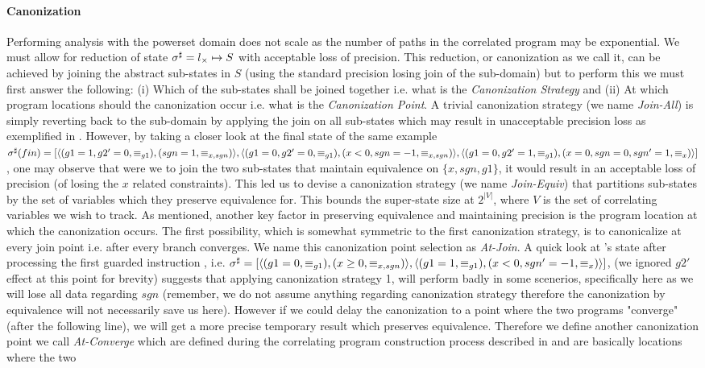 \paragraph{Canonization}
Performing analysis with the powerset domain does not scale as the number of paths in the correlated program may be exponential. We must allow for reduction of state $\sigma^\sharp = l_{\times} \mapsto S$ with acceptable loss of precision. This reduction, or canonization as we call it, can be achieved by joining the abstract sub-states in $S$ (using the standard precision losing join of the sub-domain) but to perform this we must first answer the following: (i) Which of the sub-states shall be joined together i.e. what is the \emph{Canonization Strategy} and (ii) At which program locations should the canonization occur i.e. what is the \emph{Canonization Point}. A trivial canonization strategy (we name \emph{Join-All}) is simply reverting back to the sub-domain by applying the join on all sub-states which may result in unacceptable precision loss as exemplified in . However, by taking a closer look at the final state of the same example $\sigma^\sharp(fin) = [\langle (g1=1,g2'=0,\equiv_{g1}),(sgn=1,\equiv_{x,sgn}) \rangle, \langle (g1=0,g2'=0,\equiv_{g1}), (x<0,sgn=-1,\equiv_{x,sgn}) \rangle , \langle (g1=0,g2'=1,\equiv_{g1}),(x=0,sgn=0,sgn'=1,\equiv_{x}) \rangle]$, one may observe that were we to join the two sub-states that maintain equivalence on $\{x,sgn,g1\}$, it would result in an acceptable loss of precision (of losing the $x$ related constraints). This led us to devise a canonization strategy (we name \emph{Join-Equiv}) that partitions sub-states by the set of variables which they preserve equivalence for. This bounds the super-state size at $2^{|V|}$, where $V$ is the set of correlating variables we wish to track. As mentioned, another key factor in preserving equivalence and maintaining precision is the program location at which the canonization occurs. The first possibility, which is somewhat symmetric to the first canonization strategy, is to canonicalize at every join point i.e. after every branch converges. We name this canonization point selection as \emph{At-Join}. A quick look at 's state after processing the first guarded instruction , i.e. $\sigma^\sharp = [ \langle (g1=0,\equiv_{g1}),(x \geq 0,\equiv_{x,sgn}) \rangle , \langle (g1=1,\equiv_{g1}),(x < 0,sgn' = -1, \equiv_{x}) \rangle]$, (we ignored $g2'$ effect at this point for brevity) suggests that applying canonization strategy 1, will perform badly in some scenerios, specifically here as we will lose all data regarding $sgn$ (remember, we do not assume anything regarding canonization strategy therefore the canonization by equivalence will not necessarily save us here). However if we could delay the canonization to a point where the two programs "converge" (after the following  line), we will get a more precise temporary result which preserves equivalence. Therefore we define another canonization point we call \emph{At-Converge} which are defined during the correlating program construction process described in  and are basically locations where the two 